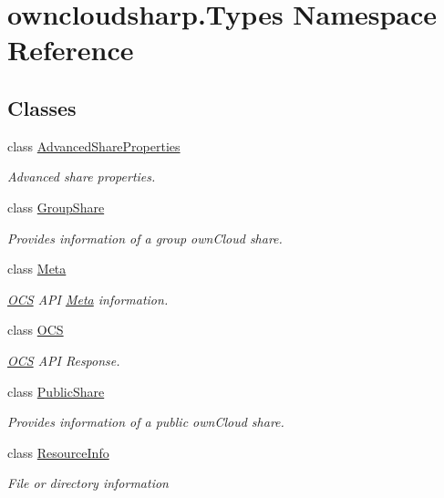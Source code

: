 \hypertarget{namespaceowncloudsharp_1_1_types}{}\section{owncloudsharp.\+Types Namespace Reference}
\label{namespaceowncloudsharp_1_1_types}
\subsection*{Classes}
\begin{DoxyCompactItemize}
\item 
class \hyperlink{classowncloudsharp_1_1_types_1_1_advanced_share_properties}{Advanced\+Share\+Properties}
\begin{DoxyCompactList}\small\item\em Advanced share properties. \end{DoxyCompactList}\item 
class \hyperlink{classowncloudsharp_1_1_types_1_1_group_share}{Group\+Share}
\begin{DoxyCompactList}\small\item\em Provides information of a group own\+Cloud share. \end{DoxyCompactList}\item 
class \hyperlink{classowncloudsharp_1_1_types_1_1_meta}{Meta}
\begin{DoxyCompactList}\small\item\em \hyperlink{classowncloudsharp_1_1_types_1_1_o_c_s}{O\+C\+S} A\+P\+I \hyperlink{classowncloudsharp_1_1_types_1_1_meta}{Meta} information. \end{DoxyCompactList}\item 
class \hyperlink{classowncloudsharp_1_1_types_1_1_o_c_s}{O\+C\+S}
\begin{DoxyCompactList}\small\item\em \hyperlink{classowncloudsharp_1_1_types_1_1_o_c_s}{O\+C\+S} A\+P\+I Response. \end{DoxyCompactList}\item 
class \hyperlink{classowncloudsharp_1_1_types_1_1_public_share}{Public\+Share}
\begin{DoxyCompactList}\small\item\em Provides information of a public own\+Cloud share. \end{DoxyCompactList}\item 
class \hyperlink{classowncloudsharp_1_1_types_1_1_resource_info}{Resource\+Info}
\begin{DoxyCompactList}\small\item\em File or directory information \end{DoxyCompactList}\item 

\end{DoxyCompactItemize}
